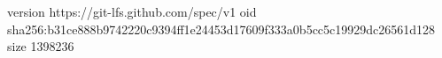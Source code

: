 version https://git-lfs.github.com/spec/v1
oid sha256:b31ce888b9742220c9394ff1e24453d17609f333a0b5cc5c19929dc26561d128
size 1398236
